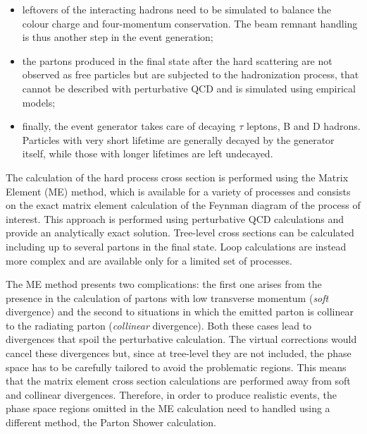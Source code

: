 \begin{itemize}
\item leftovers of the interacting hadrons need to be simulated to balance the colour charge
and four-momentum conservation. The beam remnant handling is thus another step in the event generation;

\item the partons produced in the final state after the hard scattering are not observed as free particles but are subjected to the hadronization process, that cannot be described with perturbative QCD and is simulated using empirical models;

\item finally, the event generator takes care of decaying $\tau$ leptons, B and D hadrons. Particles with very short lifetime are generally decayed by the generator itself, while those with longer lifetimes are left undecayed.
\end{itemize}

The calculation of the hard process cross section is performed using the Matrix Element (ME) method, which is available for a variety of processes and consists on the exact matrix element calculation of the Feynman diagram of the process of interest. This approach is performed using perturbative QCD calculations and provide an analytically exact solution. Tree-level cross sections can be calculated including up to several partons in the final state. Loop calculations are instead more complex and are available only for a limited set of processes. 

The ME method presents two complications: the first one arises from the presence in the calculation of partons with low transverse momentum (\emph{soft} divergence) and the second to situations in which the emitted parton is collinear to the radiating parton (\emph{collinear} divergence). Both these cases lead to divergences that spoil the perturbative calculation. The virtual corrections would cancel these divergences but, since at tree-level they are not included, the phase space has to be carefully tailored to avoid the problematic regions. This means that the matrix
element cross section calculations are performed away from soft and collinear divergences. Therefore, in order to produce realistic events, the phase space regions omitted in the ME calculation need to handled using a different method, the Parton Shower calculation.

